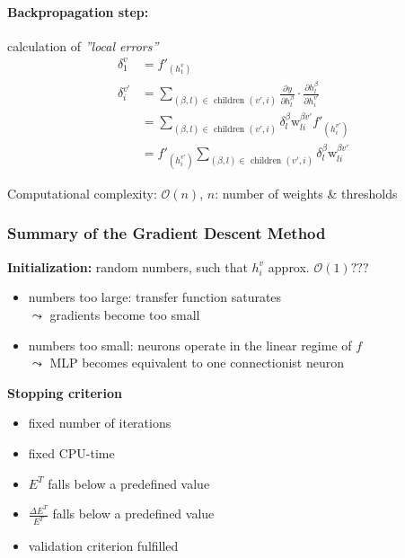\paragraph{Backpropagation step:} calculation of \emph{''local errors''}
\begin{align} \tag{initialization: outputs}
  \delta_1^v &= f'_{(h_1^v)}\\
  \delta_i^{v'} 
  & = \sum\limits_{(\beta, l) \in \text{ children } (v', i)}
  \frac{\partial y}{\partial h_l^{\beta}} \cdot
  \frac{\partial h_l^{\beta}}{\partial h_i^{v'}} \\
  & = \sum\limits_{(\beta, l) \in \text{ children } (v', i)}
  \delta_l^{\beta} \mathrm{w}_{li}^{\beta v'} f'_{(h_i^{v'})}\\
\tag{propagation}
	 &= f'_{(h_i^{v'})} \sum_{(\beta, l) 
			\in \text{ children } (v', i)}
		\delta_l^{\beta} \mathrm{w}_{li}^{\beta v'}
\end{align} 

Computational complexity: $\mathcal{O}(n)$, $n$: number of weights \& thresholds


\subsubsection{Summary of the Gradient Descent Method}
{\bf Initialization:} random numbers, such that $h_i^v$ approx. $\mathcal{O}(1)???$
\begin{itemize}
	\item numbers too large: transfer function saturates\\
          $\leadsto$ gradients become too small
	\item numbers too small: neurons operate in the linear regime of $f$\\
          $\leadsto$ MLP becomes equivalent to one connectionist neuron
\end{itemize}
{\bf Stopping criterion}
\begin{itemize}
	\item fixed number of iterations
	\item fixed CPU-time
	\item $E^T$ falls below a predefined value
	\item $\frac{\Delta E^T}{E^T}$ falls below a predefined value
	\item validation criterion fulfilled
\end{itemize}

